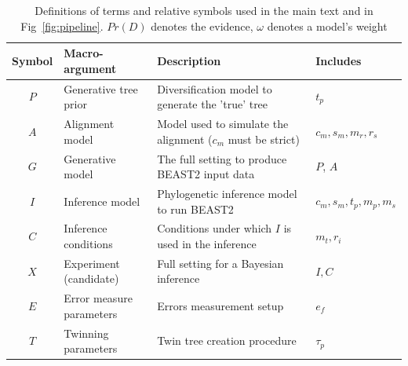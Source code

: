 \documentclass{article}
\begin{document}
\begin{table}
  \begin{tabular}{|@{}c|p{4cm}|p{9cm}|p{3cm}@{}|}
    \hline
    \centering
    \textbf{Symbol} & \textbf{Macro-argument} & \textbf{Description} 
      & \textbf{Includes} \\
    \hline
    $\mathit{P}$ & Generative tree prior & Diversification model to generate 
      the 'true' tree & $\mathit{t_{p}}$ \\
    $\mathit{A}$ & Alignment model & Model used to simulate the 
      alignment ($\mathit{c_{m}}$ must be strict) 
      & $\mathit{c_{m}}, \mathit{s_{m}}, \mathit{m_{r}}, \mathit{r_{s}}$ \\
    $\mathit{G}$ & Generative model & The full setting to produce BEAST2 input 
      data & $\mathit{P}$, $\mathit{A}$ \\
    $\mathit{I}$ & Inference model & Phylogenetic inference model to run BEAST2 
      & $\mathit{c_{m}}, \mathit{s_{m}}, \mathit{t_{p}}, 
      \mathit{m_{p}}, \mathit{m_{s}}$ \\
    $\mathit{C}$ & Inference conditions & Conditions under which $\mathit{I}$ 
      is used in the inference & $\mathit{m_{t}}, \mathit{r_{i}}$\\
    $\mathit{X}$ & Experiment (candidate) 
      & Full setting for a Bayesian inference 
      & $\mathit{I},\mathit{C}$ \\
    $\mathit{E}$ & Error measure parameters & Errors measurement setup & 
      $\mathit{e_{f}}$\\
    $\mathit{T}$ & Twinning parameters & Twin tree creation procedure & 
      $\mathit{\tau_{p}}$\\
    \hline 
  \end{tabular}
  \caption{
    Definitions of terms and relative symbols used in the main text and in 
    Fig~\ref{fig:pipeline}. $Pr(D)$ denotes the evidence, $\omega$ denotes
    a model's weight 
  }
  \label{tab:definitions}
\end{table}
\end{document}
